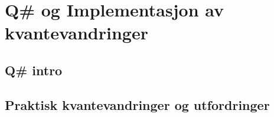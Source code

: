 \section{Q\# og Implementasjon av kvantevandringer}

\subsection{Q\# intro}

\subsection{Praktisk kvantevandringer og utfordringer}
